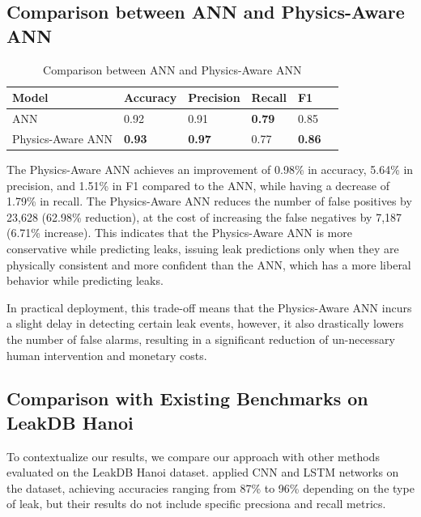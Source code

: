 \documentclass[final,5p,times,twocolumn,authoryear]{elsarticle}
\begin{document}
\subsection{Comparison between ANN and Physics-Aware ANN}

\begin{table}[H]
\centering
\caption{Comparison between ANN and Physics-Aware ANN}
\label{tab:ann_paann_comparison}
\begin{tabular}{@{}llllll@{}}
\toprule
\textbf{Model}             & \textbf{Accuracy} & \textbf{Precision} & \textbf{Recall} & \textbf{F1}     \\ \midrule
ANN               & 0.92   & 0.91    & \textbf{0.79} & 0.85 \\
Physics-Aware ANN & \textbf{0.93}   & \textbf{0.97}    & 0.77 & \textbf{0.86}  \\ \bottomrule
\end{tabular}
\end{table}

The Physics-Aware ANN achieves an improvement of 0.98\% in accuracy, 5.64\% in precision, and 1.51\% in F1 compared to the ANN, while having a decrease of 1.79\% in recall. The Physics-Aware ANN reduces the number of false positives by 23,628 (62.98\% reduction), at the cost of increasing the false negatives by 7,187 (6.71\% increase). This indicates that the Physics-Aware ANN is more conservative while predicting leaks, issuing leak predictions only when they are physically consistent and more confident than the ANN, which has a more liberal behavior while predicting leaks.

In practical deployment, this trade-off means that the Physics-Aware ANN incurs a slight delay in detecting certain leak events, however, it also drastically lowers the number of false alarms, resulting in a significant reduction of un-necessary human intervention and monetary costs.

\subsection{Comparison with Existing Benchmarks on LeakDB Hanoi}

To contextualize our results, we compare our approach with other methods evaluated on the LeakDB Hanoi dataset. \cite{punukollu2023leakdetection} applied CNN and LSTM networks on the dataset, achieving accuracies ranging from 87\% to 96\% depending on the type of leak, but their results do not include specific precsiona and recall metrics.
\end{document}
